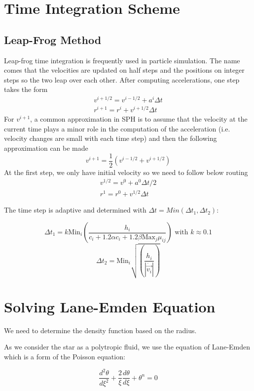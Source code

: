 \documentclass{article}
\begin{document}
\section{Time Integration Scheme}
\subsection{Leap-Frog Method}
Leap-frog time integration is frequently used in particle simulation. The name comes that the velocities are updated on half steps and the positions on integer steps so the two leap over each other. After computing accelerations, one step takes the form
\begin{align}
v^{i+1/2} = v^{i-1/2} + a^i \Delta t \\
r^{i+1} = r^i + v^{i+1/2} \Delta t
\end{align}
For $v^{i+1}$, a common approximation in SPH is to assume that the velocity at the current time plays a minor role in the computation of the acceleration (i.e. velocity changes are small with each time step) and then the following approximation can be made
\begin{equation}
v^{i+1} = \frac{1}{2} (v^{i-1/2}+v^{i+1/2})
\end{equation}
At the first step, we only have initial velocity so we need to follow below routing
\begin{align}
v^{1/2} = v^{0} + a^0 \Delta t/2 \\
r^{1} = r^0 + v^{1/2} \Delta t
\end{align}

The time step is adaptive and determined with $\Delta t = Min(\Delta t_1, \Delta t_2)$:

$$ \Delta t_1 = k \mbox{Min}_i(\frac{h_i}{c_i+1.2\alpha c_i + 1.2 \beta \mbox{Max}_j\mu_{ij}}) \mbox{ with } k \approx 0.1 $$
$$ \Delta t_2 = \mbox{Min}_i\sqrt{(\frac{h_i}{|\dot{\vec{v_i}}|})} $$

\section{Solving Lane-Emden Equation}

We need to determine the density function based on the radius.

As we consider the star as a polytropic fluid, we use the equation of Lane-Emden which is a form of the Poisson equation:

\begin{equation}\label{eq_LaneEmden}
  \frac{d^2\theta}{d \xi^2}+ \frac{2}{\xi}\frac{d\theta}{d\xi}+\theta^n = 0
\end{equation}
\end{document}
